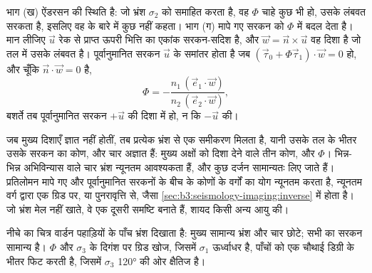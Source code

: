 भाग (ख) ऐंडरसन की स्थिति है: जो भ्रंश $\sigma_2$ को समाहित करता है, वह
$\Phi$ चाहे कुछ भी हो, उसके लंबवत सरकता है, इसलिए वह  के बारे में कुछ नहीं कहता।
भाग (ग) मापे गए सरकन को $\Phi$ में बदल देता है। मान लीजिए $\vec u$
रेक से प्राप्त ऊपरी भित्ति का एकांक सरकन-सदिश है, और $\vec w = \vec n\times\vec
u$ वह दिशा है जो तल में उसके लंबवत है। पूर्वानुमानित सरकन
$\vec u$ के समांतर होता है जब $(\vec\tau_0 + \Phi\vec\tau_1)\cdot\vec w = 0$ हो, और
चूँकि $\vec n\cdot\vec w = 0$ है,
\[
  \Phi = -\frac{n_1\,(\vec e_1\cdot\vec w)}{n_2\,(\vec e_2\cdot\vec w)} ,
\]
बशर्ते तब पूर्वानुमानित सरकन $+\vec u$ की दिशा में हो, न कि $-\vec u$ की।

जब मुख्य दिशाएँ ज्ञात नहीं होतीं, तब प्रत्येक भ्रंश से एक समीकरण मिलता है,
यानी उसके तल के भीतर उसके सरकन का कोण, और चार अज्ञात हैं: मुख्य अक्षों को दिशा देने वाले तीन कोण,
और $\Phi$। भिन्न-भिन्न अभिविन्यास वाले चार भ्रंश न्यूनतम आवश्यकता हैं,
और कुछ दर्जन सामान्यतः लिए जाते हैं। प्रतिलोमन मापे गए और पूर्वानुमानित सरकनों के बीच के कोणों के वर्गों का योग
न्यूनतम करता है, न्यूनतम वर्ग द्वारा एक ग्रिड पर, या पुनरावृत्ति से,
जैसा \cref{sec:b3:seismology-imaging:inverse} में होता है।
जो भ्रंश मेल नहीं खाते, वे एक दूसरी समष्टि बनाते हैं, शायद किसी अन्य आयु की।

नीचे का चित्र वार्डन पहाड़ियों के पाँच भ्रंश दिखाता है: मुख्य सामान्य भ्रंश
और चार छोटे; सभी का सरकन सामान्य है। $\Phi$ और $\sigma_3$ के दिगंश पर ग्रिड खोज,
जिसमें $\sigma_1$ ऊर्ध्वाधर है, पाँचों को एक चौथाई डिग्री के भीतर फिट करती है,
जिसमें $\sigma_3$ \ang{120} की ओर क्षैतिज है।

